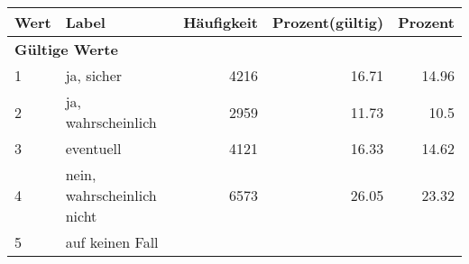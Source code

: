      \begin{longtable}{lXrrr}
     \toprule
     \textbf{Wert} & \textbf{Label} & \textbf{Häufigkeit} & \textbf{Prozent(gültig)} & \textbf{Prozent} \\
     \endhead
     \midrule
     \multicolumn{5}{l}{\textbf{Gültige Werte}}\\

     1 &
     \multicolumn{1}{X}{ ja, sicher   } &


       \num{4216} &
       \num[round-mode=places,round-precision=2]{16.71} &
         \num[round-mode=places,round-precision=2]{14.96} \\

     2 &
     \multicolumn{1}{X}{ ja, wahrscheinlich   } &


       \num{2959} &
       \num[round-mode=places,round-precision=2]{11.73} &
         \num[round-mode=places,round-precision=2]{10.5} \\

     3 &
     \multicolumn{1}{X}{ eventuell   } &


       \num{4121} &
       \num[round-mode=places,round-precision=2]{16.33} &
         \num[round-mode=places,round-precision=2]{14.62} \\

     4 &
     \multicolumn{1}{X}{ nein, wahrscheinlich nicht   } &


       \num{6573} &
       \num[round-mode=places,round-precision=2]{26.05} &
         \num[round-mode=places,round-precision=2]{23.32} \\

     5 &
     \multicolumn{1}{X}{ auf keinen Fall   } &



\end{longtable}
